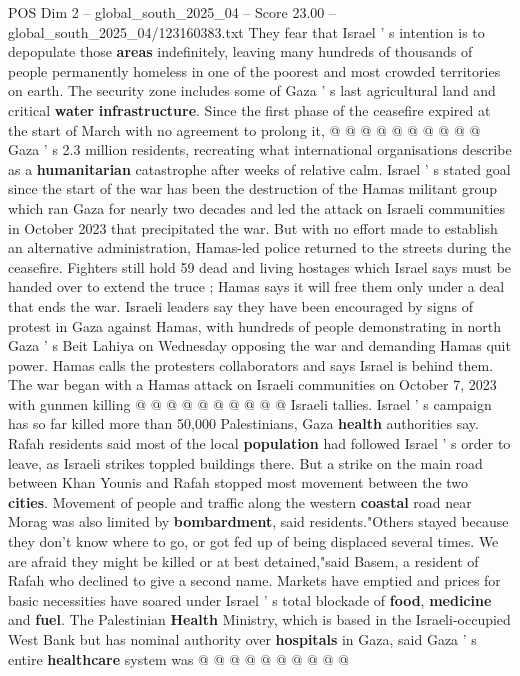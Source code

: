 \begin{textsample}{POS Dim 2 – global\_south\_2025\_04 – Score 23.00 – global\_south\_2025\_04/123160383.txt}
They fear that Israel ' s intention is to depopulate those \textbf{areas} indefinitely, leaving many hundreds of thousands of people permanently homeless in one of the poorest and most crowded territories on earth.
The security zone includes some of Gaza ' s last agricultural land and critical \textbf{water} \textbf{infrastructure}.
Since the first phase of the ceasefire expired at the start of March with no agreement to prolong it, @ @ @ @ @ @ @ @ @ @ Gaza ' s 2.3 million residents, recreating what international organisations describe as a \textbf{humanitarian} catastrophe after weeks of relative calm.
Israel ' s stated goal since the start of the war has been the destruction of the Hamas militant group which ran Gaza for nearly two decades and led the attack on Israeli communities in October 2023 that precipitated the war.
But with no effort made to establish an alternative administration, Hamas-led police returned to the streets during the ceasefire.
Fighters still hold 59 dead and living hostages which Israel says must be handed over to extend the truce ; Hamas says it will free them only under a deal that ends the war.
Israeli leaders say they have been encouraged by signs of protest in Gaza against Hamas, with hundreds of people demonstrating in north Gaza ' s Beit Lahiya on Wednesday opposing the war and demanding Hamas quit power.
Hamas calls the protesters collaborators and says Israel is behind them.
The war began with a Hamas attack on Israeli communities on October 7, 2023 with gunmen killing @ @ @ @ @ @ @ @ @ @ Israeli tallies.
Israel ' s campaign has so far killed more than 50,000 Palestinians, Gaza \textbf{health} authorities say.
Rafah residents said most of the local \textbf{population} had followed Israel ' s order to leave, as Israeli strikes toppled buildings there.
But a strike on the main road between Khan Younis and Rafah stopped most movement between the two \textbf{cities}.
Movement of people and traffic along the western \textbf{coastal} road near Morag was also limited by \textbf{bombardment}, said residents."Others stayed because they don't know where to go, or got fed up of being displaced several times.
We are afraid they might be killed or at best detained,"said Basem, a resident of Rafah who declined to give a second name.
Markets have emptied and prices for basic necessities have soared under Israel ' s total blockade of \textbf{food}, \textbf{medicine} and \textbf{fuel}.
The Palestinian \textbf{Health} Ministry, which is based in the Israeli-occupied West Bank but has nominal authority over \textbf{hospitals} in Gaza, said Gaza ' s entire \textbf{healthcare} system was @ @ @ @ @ @ @ @ @ @

\end{textsample}

